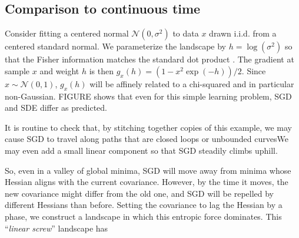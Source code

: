 \documentclass{article}
\theoremstyle{plain}
\theoremstyle{definition}
\newcommand{\Nn}{\mathcal{N}}   \newcommand{\NN}{\mathbb{N}}
\newcommand{\sizeddia}[2]{
    \begin{gathered}
        \texttt{[image: ../diagrams/\#1.png]}
    \end{gathered}
}
\newcommand{\sdia}[1]{\protect \sizeddia{#1}{0.10}}
\begin{document}
    \subsection{Comparison to continuous time} \label{subsect:gaussfit}
        Consider fitting a centered normal $\Nn(0, \sigma^2)$ to data $x$ drawn 
        i.i.d. from a centered standard normal.  We parameterize the landscape
        by $h=\log(\sigma^2)$ so that the Fisher information matches the
        standard dot product \citep{am98}.  The gradient at sample $x$ and
        weight $h$ is then $g_x(h) = (1-x^2\exp(-h))/2$.  Since $x\sim
        \Nn(0, 1)$, $g_x(h)$ will be affinely related to a chi-squared and in
        particular non-Gaussian.
        {\color{red} FIGURE} shows that even for this simple learning problem, 
        SGD and SDE differ as predicted.

        It is routine to check that, by stitching together copies of this
        example, we may cause SGD to travel along paths that are closed loops
        or unbounded curvesWe may even add a small linear component so
        that SGD steadily climbs uphill.  

        So, even in a valley of global minima,
        SGD will move away from minima whose Hessian aligns with the current
        covariance.  However, by the time it moves, the new covariance might
        differ from the old one, and SGD will be repelled by different Hessians
        than before.  Setting the covariance to lag the Hessian by a phase, we
        construct a landscape in which this entropic force dominates.  This
        ``\emph{linear screw}'' landscape has


\end{document}

